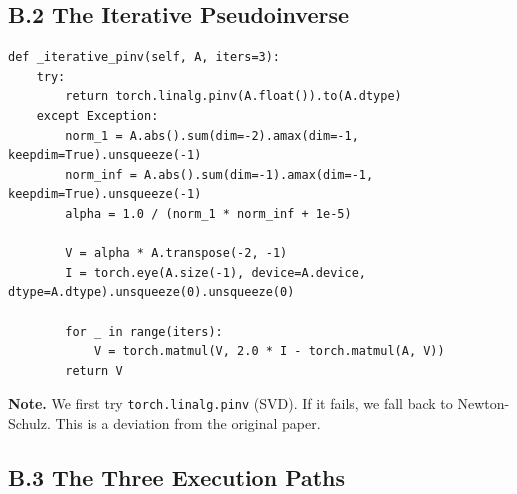 \subsection{B.2 The Iterative Pseudoinverse}

\begin{lstlisting}
def _iterative_pinv(self, A, iters=3):
    try:
        return torch.linalg.pinv(A.float()).to(A.dtype)
    except Exception:
        norm_1 = A.abs().sum(dim=-2).amax(dim=-1, keepdim=True).unsqueeze(-1)
        norm_inf = A.abs().sum(dim=-1).amax(dim=-1, keepdim=True).unsqueeze(-1)
        alpha = 1.0 / (norm_1 * norm_inf + 1e-5)
        
        V = alpha * A.transpose(-2, -1)
        I = torch.eye(A.size(-1), device=A.device, dtype=A.dtype).unsqueeze(0).unsqueeze(0)
        
        for _ in range(iters):
            V = torch.matmul(V, 2.0 * I - torch.matmul(A, V))
        return V
\end{lstlisting}

\textbf{Note.} We first try \texttt{torch.linalg.pinv} (SVD). If it fails, we fall back 
to Newton-Schulz. This is a deviation from the original paper.

\subsection{B.3 The Three Execution Paths}

